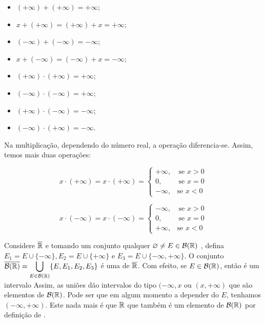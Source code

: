     \begin{multicols}{2}
        \begin{itemize}
            \item $(+ \infty) + (+ \infty)  = + \infty$;
            \item $x + (+ \infty) = (+ \infty) + x = + \infty$;
            \item $(- \infty) + (- \infty)  = - \infty$;
            \item $x + (- \infty) = (- \infty) + x = - \infty$;
            \item $(+ \infty)\cdot (+ \infty) =  +\infty $;
            \item $(- \infty)\cdot (- \infty) =  +\infty $;
            \item $(+ \infty)\cdot (- \infty) =  -\infty $;
            \item $(- \infty)\cdot (+ \infty) =  -\infty $.
        \end{itemize}

    \end{multicols}
    Na multiplicação, dependendo do número real, a operação diferencia-se. Assim, temos mais duas operações:
    \begin{multicols}{2}
    $$
    x \cdot (+\infty) = x \cdot (+\infty) =
    \left\{\begin{array}{cc}
          +\infty, & \ \textrm{se } x > 0\\
          0, & \ \textrm{se } x = 0\\
          - \infty, & \textrm{se } x < 0
    \end{array}\right.
    $$
    
    $$
    x \cdot (-\infty) = x \cdot (-\infty) =
    \left\{\begin{array}{cc}
          -\infty, & \ \textrm{se } x > 0\\
          0, & \ \textrm{se } x = 0\\
          + \infty, & \textrm{se } x < 0
    \end{array}\right.
    $$
        
    \end{multicols}

    Considere $\operatorname{\overline{\mathbb{R}}}$ e tomando um conjunto qualquer $\varnothing \neq E \in \operatorname{\mathcal{B}(\mathbb{R})}$ , defina $E_1 = E \cup \{-\infty\}, E_2 = E \cup \{+\infty\}$ e $E_3 = E \cup \{-\infty, +\infty\}$. 
    O conjunto $\overline{\operatorname{\mathcal{B}(\mathbb{R})}} = \displaystyle \bigcup_{E \in \operatorname{\mathcal{B}(\mathbb{R})}} \{E, E_1, E_2, E_3\}$ é uma \sigal de $\operatorname{\overline{\mathbb{R}}}$. Com efeito, se $E \in \operatorname{\mathcal{B}(\mathbb{R})}$, então é um intervalo
    Assim, as uniões dão intervalos do tipo $(-\infty,x$ ou $(x, +\infty)$ que são elementos de $\operatorname{\mathcal{B}(\mathbb{R})}$.
    Pode ser que em algum momento a depender do $E$, tenhamos $(-\infty, +\infty)$.
    Este nada mais é que $\mathbb{R}$ que também é um elemento de $\operatorname{\mathcal{B}(\mathbb{R})}$ por definição de \sigal.

